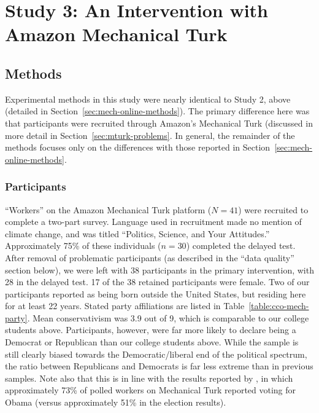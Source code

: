 \section{Study 3: An Intervention with Amazon Mechanical Turk}
\label{sec:mech-mturk}

\subsection{Methods}

Experimental methods in this study were nearly identical to Study 2, above
(detailed in Section~\ref{sec:mech-online-methods}). The primary difference here
was that participants were recruited through Amazon's Mechanical Turk (discussed
in more detail in Section~\ref{sec:mturk-problems}. In general, the remainder of the
methods focuses only on the differences with those reported in
Section~\ref{sec:mech-online-methods}.

\subsubsection{Participants}

“Workers” on the Amazon Mechanical Turk platform ($N=41$) were recruited to
complete a two-part survey. Language used in recruitment made no mention of
climate change, and was titled “Politics, Science, and Your Attitudes.”
Approximately 75\% of these individuals ($n=30$) completed the delayed test.
After removal of problematic participants (as described in the “data quality”
section below), we were left with 38 participants in the primary intervention,
with 28 in the delayed test. 17 of the 38 retained participants were female.
Two of our participants reported as being born outside the United States, but
residing here for at least 22 years. Stated party affiliations are listed in
Table~\ref{table:cco-mech-party}. Mean conservativism was 3.9 out of 9, which is
comparable to our college students above. Participants, however, were far more
likely to declare being a Democrat or Republican than our college students above.
While the sample is still clearly biased towards the Democratic/liberal end of
the political spectrum, the ratio between Republicans and Democrats is far less
extreme than in previous samples. Note also that this is in line with the
results reported by \textcite{richey_how_2012}, in which approximately 73\% of
polled workers on Mechanical Turk reported voting for Obama (versus
approximately 51\% in the election results).

